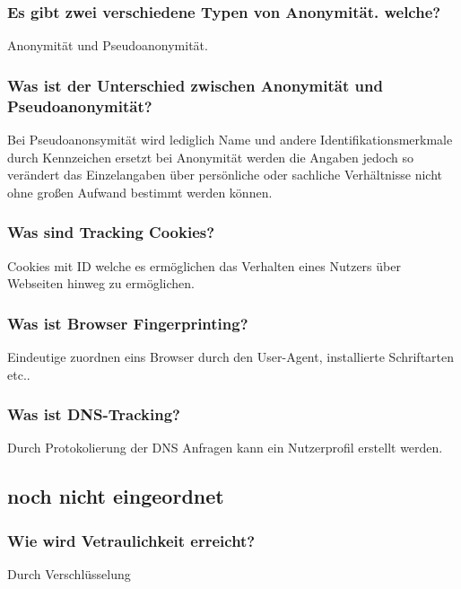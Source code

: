 	\subsubsection{Es gibt zwei verschiedene Typen von Anonymität. welche?}
	Anonymität und Pseudoanonymität.
	
	\subsubsection{Was ist der Unterschied zwischen Anonymität und Pseudoanonymität?}
	Bei Pseudoanonsymität wird lediglich Name und andere Identifikationsmerkmale durch Kennzeichen ersetzt bei Anonymität werden die Angaben jedoch so verändert das Einzelangaben über persönliche oder sachliche Verhältnisse nicht ohne großen Aufwand bestimmt werden können.	
	
	\subsubsection{Was sind Tracking Cookies?}
	Cookies mit ID welche es ermöglichen das Verhalten eines Nutzers über Webseiten hinweg zu ermöglichen.
	
	\subsubsection{Was ist Browser Fingerprinting?}
	Eindeutige zuordnen eins Browser durch den User-Agent, installierte Schriftarten etc.. 
	
	\subsubsection{Was ist DNS-Tracking?}
	Durch Protokolierung der DNS Anfragen kann ein Nutzerprofil erstellt werden.
	\subsection{noch nicht eingeordnet}
	
	\subsubsection{Wie wird Vetraulichkeit erreicht?}
	Durch Verschlüsselung

